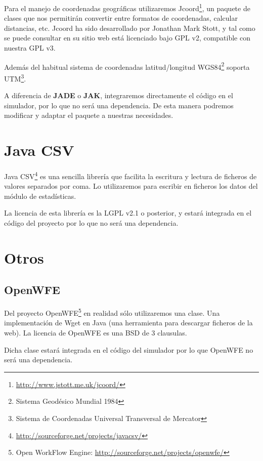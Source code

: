 Para el manejo de coordenadas geográficas utilizaremos
Jcoord\footnote{\url{http://www.jstott.me.uk/jcoord/}}, un paquete de clases que
nos permitirán convertir entre formatos de coordenadas, calcular distancias,
etc. Jcoord ha sido desarrollado por Jonathan Mark Stott, y tal como se puede
consultar en su sitio web está licenciado bajo GPL v2, compatible con nuestra
GPL v3. %

Además del habitual sistema de coordenadas latitud/longitud
WGS84\footnote{Sistema Geodésico Mundial 1984} soporta UTM\footnote{Sistema de
Coordenadas Universal Transversal de Mercator}.

A diferencia de {\bf JADE} o {\bf JAK}, integraremos directamente el código en
el simulador, por lo que no será una dependencia. De esta manera podremos
modificar y adaptar el paquete a nuestras necesidades.

\section*{Java CSV}

Java CSV\footnote{\url{http://sourceforge.net/projects/javacsv/}} es una
sencilla librería que facilita la escritura y lectura de ficheros de valores
separados por coma. Lo utilizaremos para escribir en ficheros los datos del
módulo de estadísticas.

La licencia de esta librería es la LGPL v2.1 o posterior, y estará integrada en
el código del proyecto por lo que no será una dependencia.

\section*{Otros}


\subsection*{OpenWFE}

Del proyecto OpenWFE\footnote{Open WorkFlow Engine:
\url{http://sourceforge.net/projects/openwfe/}} en realidad sólo utilizaremos
una clase. Una implementación de Wget en Java (una herramienta para descargar
ficheros de la web). La licencia de OpenWFE es una BSD de 3 clausulas.

Dicha clase estará integrada en el código del simulador por lo que OpenWFE no
será una dependencia.
